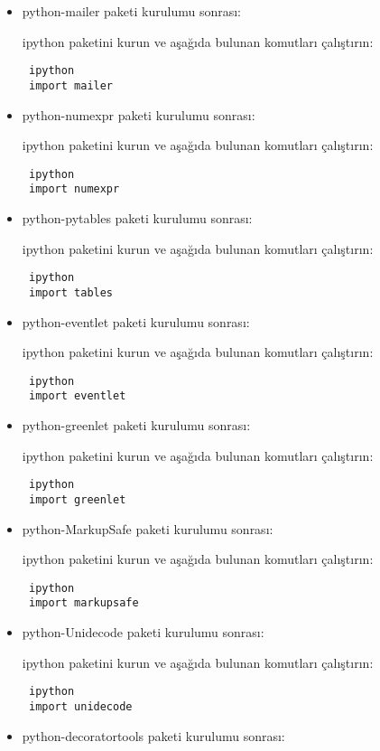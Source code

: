 \documentclass[a4paper,10pt]{article}
\begin{document}
\begin{itemize}
\item python-mailer paketi kurulumu sonrası:

ipython paketini kurun ve aşağıda bulunan komutları çalıştırın:
\begin{verbatim}
 ipython
 import mailer
\end{verbatim}

\item python-numexpr paketi kurulumu sonrası:

ipython paketini kurun ve aşağıda bulunan komutları çalıştırın:
\begin{verbatim}
 ipython
 import numexpr
\end{verbatim}

\item python-pytables paketi kurulumu sonrası:

ipython paketini kurun ve aşağıda bulunan komutları çalıştırın:
\begin{verbatim}
 ipython
 import tables
\end{verbatim}

\item python-eventlet paketi kurulumu sonrası:

ipython paketini kurun ve aşağıda bulunan komutları çalıştırın:
\begin{verbatim}
 ipython
 import eventlet
\end{verbatim}

\item python-greenlet paketi kurulumu sonrası:

ipython paketini kurun ve aşağıda bulunan komutları çalıştırın:
\begin{verbatim}
 ipython
 import greenlet
\end{verbatim}

\item python-MarkupSafe paketi kurulumu sonrası:

ipython paketini kurun ve aşağıda bulunan komutları çalıştırın:
\begin{verbatim}
 ipython
 import markupsafe
\end{verbatim}

\item python-Unidecode paketi kurulumu sonrası:

ipython paketini kurun ve aşağıda bulunan komutları çalıştırın:
\begin{verbatim}
 ipython
 import unidecode
\end{verbatim}

\item python-decoratortools paketi kurulumu sonrası:


\end{itemize}
\end{document}
